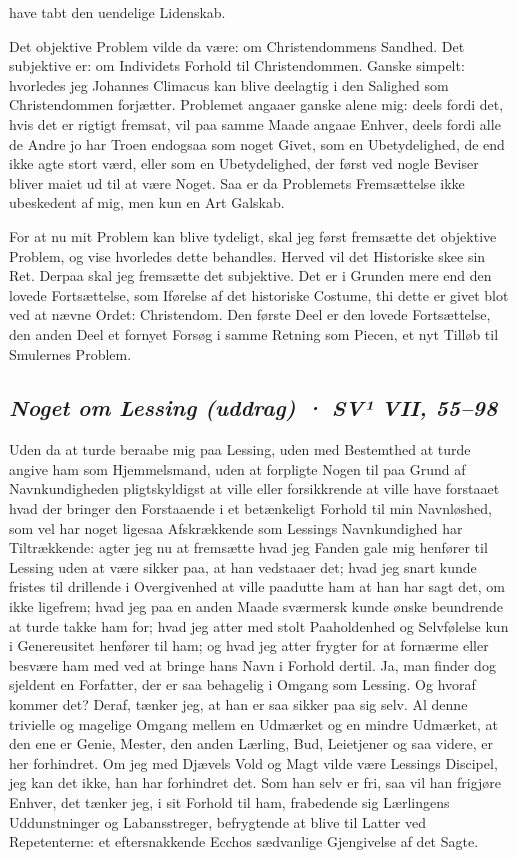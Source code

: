 \documentclass[12pt,a4paper]{article}
\newcommand{\sectionheading}[1]{\subsection*{\normalfont\itshape #1}}
\begin{document}
have tabt den uendelige Lidenskab.

Det objektive Problem vilde da være: om Christendommens Sandhed. Det subjektive er: om Individets Forhold til Christendommen. Ganske simpelt: hvorledes jeg Johannes Climacus kan blive deelagtig i den Salighed som Christendommen forjætter. Problemet angaaer ganske alene mig: deels fordi det, hvis det er rigtigt fremsat, vil paa samme Maade angaae Enhver, deels fordi alle de Andre jo har Troen endogsaa som noget Givet, som en Ubetydelighed, de end ikke agte stort værd, eller som en Ubetydelighed, der først ved nogle Beviser bliver maiet ud til at være Noget. Saa er da Problemets Fremsættelse ikke ubeskedent af mig, men kun en Art Galskab.

For at nu mit Problem kan blive tydeligt, skal jeg først fremsætte det objektive Problem, og vise hvorledes dette behandles. Herved vil det Historiske skee sin Ret. Derpaa skal jeg fremsætte det subjektive. Det er i Grunden mere end den lovede Fortsættelse, som Iførelse af det historiske Costume, thi dette er givet blot ved at nævne Ordet: Christendom. Den første Deel er den lovede Fortsættelse, den anden Deel et fornyet Forsøg i samme Retning som Piecen, et nyt Tilløb til Smulernes Problem.

\sectionheading{Noget om Lessing (uddrag)  ·  SV¹ VII, 55–98}

Uden da at turde beraabe mig paa Lessing, uden med Bestemthed at turde angive ham som Hjemmelsmand, uden at forpligte Nogen til paa Grund af Navnkundigheden pligtskyldigst at ville eller forsikkrende at ville have forstaaet hvad der bringer den Forstaaende i et betænkeligt Forhold til min Navnløshed, som vel har noget ligesaa Afskrækkende som Lessings Navnkundighed har Tiltrækkende: agter jeg nu at fremsætte hvad jeg Fanden gale mig henfører til Lessing uden at være sikker paa, at han vedstaaer det; hvad jeg snart kunde fristes til drillende i Overgivenhed at ville paadutte ham at han har sagt det, om ikke ligefrem; hvad jeg paa en anden Maade sværmersk kunde ønske beundrende at turde takke ham for; hvad jeg atter med stolt Paaholdenhed og Selvfølelse kun i Genereusitet henfører til ham; og hvad jeg atter frygter for at fornærme eller besvære ham med ved at bringe hans Navn i Forhold dertil. Ja, man finder dog sjeldent en Forfatter, der er saa behagelig i Omgang som Lessing. Og hvoraf kommer det? Deraf, tænker jeg, at han er saa sikker paa sig selv. Al denne trivielle og magelige Omgang mellem en Udmærket og en mindre Udmærket, at den ene er Genie, Mester, den anden Lærling, Bud, Leietjener og saa videre, er her forhindret. Om jeg med Djævels Vold og Magt vilde være Lessings Discipel, jeg kan det ikke, han har forhindret det. Som han selv er fri, saa vil han frigjøre Enhver, det tænker jeg, i sit Forhold til ham, frabedende sig Lærlingens Uddunstninger og Labansstreger, befrygtende at blive til Latter ved Repetenterne: et eftersnakkende Ecchos sædvanlige Gjengivelse af det Sagte.
\end{document}
